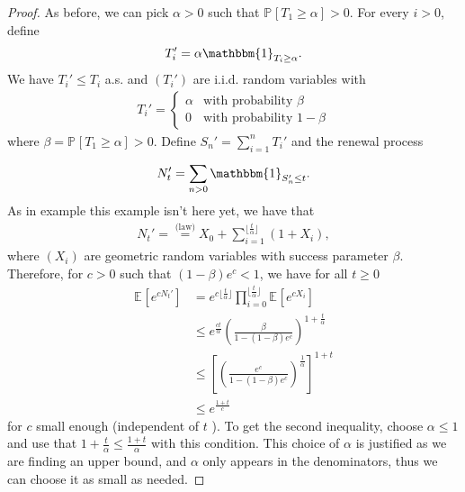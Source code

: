 \begin{proof}
	As before, we can pick $\alpha>0$ such that $\mathbb{P}_{} \left[ T_1 \geq \alpha  \right] >0$. For every $i> 0$, define
	\begin{align}
		T_i' = \alpha \mathbbm{1}_{T_i \geq \alpha}. 
	\end{align}
	We have $T_i' \leq T_i$ a.s. and $(T_i')$ are i.i.d. random variables with 
	\begin{align}
		T_i' = 
		\begin{cases}
			\alpha & \textrm{with probability } \beta \\
			0 & \textrm{with probability } 1-\beta
		\end{cases}
	\end{align}
	where $\beta = \mathbb{P}_{} \left[ T_1 \geq \alpha \right] > 0 $. Define $S_n'= \sum_{i=1}^{n} T_i'$ and the renewal process
	\begin{align}
		N_t' = \sum_{n> 0}^{} \mathbbm{1}_{S_n' \leq t} .
	\end{align}
	As in example {\color{blue} this example isn't here yet}, we have that
	\begin{align}
		N_t' = \stackrel{\textrm{(law)}}{=} X_0 + \sum_{i=1}^{\lfloor \frac{t}{\alpha } \rfloor} (1 + X_i),
	\end{align}
	where $(X_i)$ are geometric random variables with success parameter $\beta$. Therefore, for $c> 0$ such that $(1-\beta)e^c<1$, we have for all $t\geq 0$
	\begin{align}
	\mathbb{E}_{} \left[ e^{cN_t'} \right]  &= e ^{c\lfloor \frac{t}{\alpha}\rfloor} \prod_{i=0}^{\lfloor \frac{t}{\alpha }\rfloor} \mathbb{E}_{} \left[ e^{cX_i} \right] \\
						&\leq e^{\frac{ct}{\alpha }} \left( \frac{\beta }{1 - (1-\beta )e^c} \right)^{1 + \frac{t}{\alpha }} \\
						&\leq \left[ \left( \frac{e^c}{1 - (1-\beta )e^c} \right)^{\frac{1}{\alpha }} \right]^{1+t} \\
						&\leq e^\frac{1+t}{c}
	\end{align}
	for $c$ small enough (independent of $t$ ).
	{\color{blue} To get the second inequality, choose $\alpha \leq 1$ and use that $1+ \frac{t}{\alpha } \leq \frac{1+t}{\alpha }$ with this condition. This choice of $\alpha $ is justified as we are finding an upper bound, and $\alpha $ only appears in the denominators, thus we can choose it as small as needed.}	
\end{proof}


